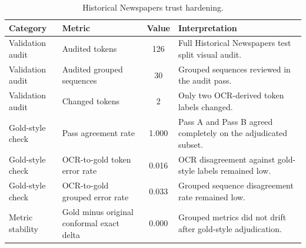 \begin{table}[t]
\caption{Historical Newspapers trust hardening.}
\label{tab:appendix_trust}
\centering
\footnotesize
\setlength{\tabcolsep}{3pt}
\renewcommand{\arraystretch}{1.06}
\begin{tabular}{@{}p{1.7cm}p{2.8cm}cp{4.5cm}@{}}
\toprule
\textbf{Category} & \textbf{Metric} & \textbf{Value} & \textbf{Interpretation} \\
\midrule
Validation audit & Audited tokens & 126 & Full Historical Newspapers test split visual audit. \\
Validation audit & Audited grouped sequences & 30 & Grouped sequences reviewed in the audit pass. \\
Validation audit & Changed tokens & 2 & Only two OCR-derived token labels changed. \\
Gold-style check & Pass agreement rate & 1.000 & Pass A and Pass B agreed completely on the adjudicated subset. \\
Gold-style check & OCR-to-gold token error rate & 0.016 & OCR disagreement against gold-style labels remained low. \\
Gold-style check & OCR-to-gold grouped error rate & 0.033 & Grouped sequence disagreement rate remained low. \\
Metric stability & Gold minus original conformal exact delta & 0.000 & Grouped metrics did not drift after gold-style adjudication. \\
\bottomrule
\end{tabular}
\end{table}

